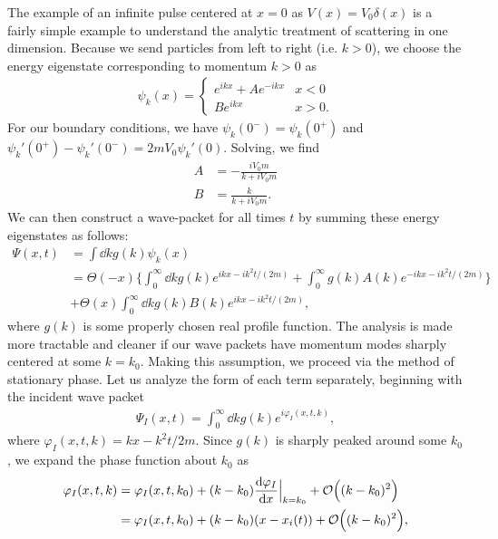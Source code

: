 The example of an infinite pulse centered at $x = 0$ as $V(x) = V_0 \delta(x)$ is a fairly simple example to understand the analytic treatment of scattering in one dimension.
Because we send particles from left to right (i.e. $k > 0$), we choose the energy eigenstate corresponding to momentum $k > 0$ as
\begin{align}
    \psi_{k}(x) = 
    \begin{cases}
        e^{i k x} + A e^{-i k x} & x < 0 \\
        B e^{i k x} & x > 0
    .\end{cases}
\end{align}
For our boundary conditions, we have $\psi_{k}(0^{-}) = \psi_{k}(0^{+})$ and $\psi_{k}'(0^{+}) - \psi_{k}'(0^{-}) = 2 m V_0 \psi_{k}'(0)$.
Solving, we find
\begin{align}
    A &= -\frac{i V_0 m}{k + i V_0 m} \\
    B &= \frac{k}{k + i V_0 m}
.\end{align}
We can then construct a wave-packet for all times $t$ by summing these energy eigenstates as follows:
\begin{align}
    \Psi(x,t) &= \int \dd{k} g(k) \psi_{k}(x) \nonumber \\
              &= \Theta(-x) \Bigg\{ \int_{0}^{\infty} \dd{k} g(k) e^{i k x - i k^2 t / (2m)} + \int_{0}^{\infty} g(k) A(k) e^{-i k x - i k^2 t / (2m)} \Bigg\} \nonumber \\
              &+ \Theta(x) \int_{0}^{\infty} \dd{k} g(k) B(k) e^{i k x - i k^2 t / (2m)}
,\end{align}
where $g(k)$ is some properly chosen real profile function.
The analysis is made more tractable and cleaner if our wave packets have momentum modes sharply centered at some $k = k_0$.
Making this assumption, we proceed via the method of stationary phase.
Let us analyze the form of each term separately, beginning with the incident wave packet
\begin{align}
    \Psi_{I}(x,t) = \int_{0}^{\infty} \dd{k} g(k) e^{i \varphi_{I}(x,t,k)}
,\end{align}
where $\varphi_{I}(x,t,k) = kx - k^2 t / 2m$.
Since $g(k)$ is sharply peaked around some $k_0$, we expand the phase function about $k_{0}$ as
\begin{align}
    \varphi_{I}(x,t,k) &= \varphi_{I}(x,t,k_0) + (k - k_0) \dv{\varphi_{I}}{x}\Big|_{k=k_0} + \mathcal{O}\Big( (k - k_0)^2 \Big) \nonumber \\
                       &= \varphi_{I}(x,t,k_0) + (k - k_0) (x - x_{i}(t)) + \mathcal{O}\Big( (k - k_0)^2 \Big)
,\end{align}
